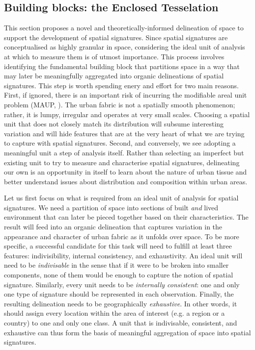 \subsection{Building blocks: the Enclosed Tesselation}
\label{ssec:ss_et}

This section proposes a novel and theoretically-informed delineation of space
to support the development of spatial signatures.
Since spatial signatures are conceptualised as highly granular in space,
considering the ideal unit of analysis at which to measure them is of utmost
importance.
%
This process involves identifying the fundamental building block that
partitions space in a way that may later be meaningfully aggregated into
organic delineations of spatial signatures.
%
This step is worth spending enery and effort for two main reasons.
First, if ignored, there is an important risk of incurring the modifiable
areal unit problem (MAUP, \citealp{openshaw1981modifiable}). The urban fabric is
not a spatially smooth phenomenon; rather, it is lumpy, irregular and operates
at very small scales.
%
Choosing a spatial unit that does not closely match its distribution will
subsume interesting variation and will hide features that are at the very
heart of what we are trying to capture with spatial signatures.
Second, and conversely, we see adopting a meaningful unit a step of analysis
itself. Rather than selecting an imperfect but existing unit to try to measure
and characterise spatial signatures, delineating our own is an opportunity in
itself to learn about the nature of urban tissue and better understand issues
about distribution and composition within urban areas.

Let us first focus on what is required from an ideal unit of analysis for
spatial signatures. We need a partition of space into sections of built
\textit{and} lived environment that can later be pieced together based on
their characteristics. The result will feed into an organic delineation that
captures variation in the appearance and character of urban fabric as it
unfolds over space.
%
To be more specific, a successful candidate for this task will need to fulfill
at least three features: indivisibility, internal consistency, and exhaustivity.
An ideal unit will need to be \textit{indivisable} in the sense that if it
were to be broken into smaller components, none of them would be enough to
capture the notion of spatial signature.
Similarly, every unit needs to be \textit{internally consistent}: one and only
one type of signature should be represented in each observation.
Finally, the resulting delineation needs to be geographically
\textit{exhaustive}. In other words, it should assign every location within
the area of interest (e.g. a region or a country) to one and only one class.
A unit that is indivisable, consistent, and exhaustive can thus form the basis
of meaningful aggregation of space into spatial signatures.

